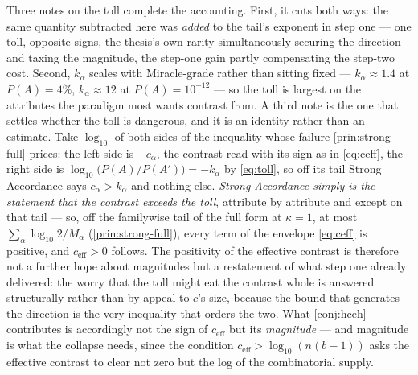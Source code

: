 \documentclass[11pt]{article}
\theoremstyle{definition}
\begin{document}
Three notes on the toll complete the accounting. First, it cuts both ways: the same quantity subtracted here was \emph{added} to the tail's exponent in step one --- one toll, opposite signs, the thesis's own rarity simultaneously securing the direction and taxing the magnitude, the step-one gain partly compensating the step-two cost. Second, $k_\alpha$ scales with Miracle-grade rather than sitting fixed --- $k_\alpha \approx 1.4$ at $P(A) = 4\%$, $k_\alpha \approx 12$ at $P(A) = 10^{-12}$ --- so the toll is largest on the attributes the paradigm most wants contrast from. A third note is the one that settles whether the toll is dangerous, and it is an identity rather than an estimate. Take $\log_{10}$ of both sides of the inequality whose failure \autoref{prin:strong-full} prices: the left side is $-c_\alpha$, the contrast read with its sign as in \eqref{eq:ceff}, the right side is $\log_{10}\bigl(P(A)/P(A')\bigr) = -k_\alpha$ by \eqref{eq:toll}, so off its tail Strong Accordance says $c_\alpha > k_\alpha$ and nothing else. \emph{Strong Accordance simply is the statement that the contrast exceeds the toll}, attribute by attribute and except on that tail --- so, off the familywise tail of the full form at $\kappa = 1$, at most $\sum_\alpha \log_{10} 2/M_\alpha$ (\autoref{prin:strong-full}), every term of the envelope \eqref{eq:ceff} is positive, and $c_{\mathrm{eff}} > 0$ follows. The positivity of the effective contrast is therefore not a further hope about magnitudes but a restatement of what step one already delivered: the worry that the toll might eat the contrast whole is answered structurally rather than by appeal to $c$'s size, because the bound that generates the direction is the very inequality that orders the two. What \autoref{conj:hceh} contributes is accordingly not the sign of $c_{\mathrm{eff}}$ but its \emph{magnitude} --- and magnitude is what the collapse needs, since the condition $c_{\mathrm{eff}} > \log_{10}(n(b-1))$ asks the effective contrast to clear not zero but the log of the combinatorial supply.
\end{document}
